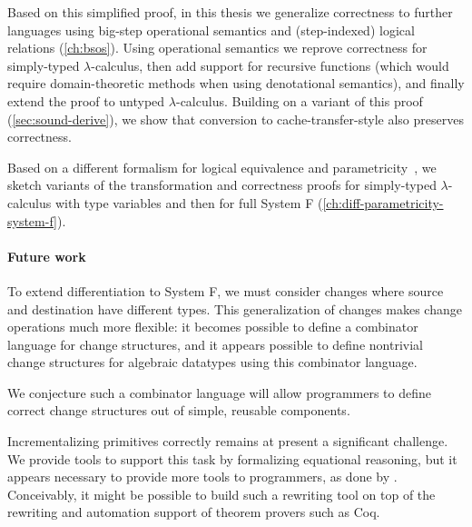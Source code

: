 Based on this simplified proof, in this thesis we generalize correctness to
further languages
using big-step operational semantics and (step-indexed) logical relations (\cref{ch:bsos}).
Using operational semantics we reprove correctness for simply-typed
$\lambda$-calculus, then add support for recursive functions (which would
require domain-theoretic methods when using denotational semantics), and finally
extend the proof to untyped $\lambda$-calculus. Building on a variant of this
proof (\cref{sec:sound-derive}), we show that conversion to cache-transfer-style
also preserves correctness.

Based on a different formalism for logical equivalence and
parametricity~\citep{Bernardy2011realizability}, we sketch variants of the
transformation and correctness proofs for simply-typed $\lambda$-calculus with
type variables and then for full System F (\cref{ch:diff-parametricity-system-f}).

\paragraph{Future work}
To extend differentiation to System F, we must consider changes where source and
destination have different types. This generalization of changes makes change
operations much more flexible: it becomes possible to define a combinator
language for change structures, and it appears possible to define nontrivial
change structures for algebraic datatypes using this combinator language.

We conjecture such a combinator language will allow programmers to define
correct change structures out of simple, reusable components.

Incrementalizing primitives correctly remains at present a significant
challenge. We provide tools to support this task by formalizing equational
reasoning, but it appears necessary to provide more tools to programmers, as
done by \citet{Liu00}. Conceivably, it might be possible to build such a
rewriting tool on top of the rewriting and automation support of theorem provers
such as Coq.


